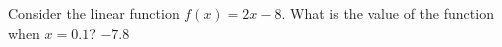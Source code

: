 {Consider the linear function $f(x)=2x-8$. What is the value of the function when $x=0.1$?}
{$-7.8$}
